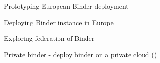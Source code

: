 \begin{task}[
  title=Prototype European Binder,
  id=eu-binder,
  lead=SRL,
  PM=25,
  wphases={0-48},
  partners={SRL,EGI,WTT,UPSUD}
]
  Prototyping European Binder deployment

  \begin{compactitem}
  \item Deploying Binder instance in Europe
  \item Exploring federation of Binder
  \item Private binder - deploy binder on a private cloud
    ()
  \end{compactitem}
\end{task}
